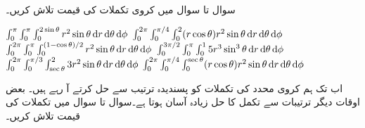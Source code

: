 \\
سوال  تا سوال  میں کروی تکملات کی قیمت تلاش کریں۔

$\int_{0}^{\pi}\int_{0}^{\pi}\int_{0}^{2\sin\theta} r^2\sin\theta \dif r\dif\theta\dif\phi$
$\int_{0}^{2\pi}\int_{0}^{\pi/4}\int_{0}^{2} (r\cos\theta) r^2\sin\theta\dif r\dif\theta\dif\phi$
$\int_{0}^{2\pi}\int_{0}^{\pi}\int_{0}^{(1-\cos\theta)/2} r^2\sin\theta\dif r\dif\theta\dif\phi$
$\int_{0}^{3\pi/2}\int_{0}^{\pi}\int_{0}^{1} 5 r^3\sin^3\theta\dif r\dif\theta\dif\phi$
$\int_{0}^{2\pi}\int_{0}^{\pi/3}\int_{\sec\theta}^{2} 3 r^2\sin\theta\dif r\dif\theta\dif\phi$
\wf{\unexpanded{
\(5\pi \)
}}
$\int_{0}^{2\pi}\int_{0}^{\pi/4}\int_{0}^{\sec\theta} (r\cos\theta) r^2\sin\theta\dif r\dif\theta\dif\phi$

اب تک ہم   کروی  محدد کی تکملات  کو پسندیدہ  ترتیب   سے حل کرتے آ رہے ہیں۔ بعض اوقات دیگر ترتیبات سے تکمل کا حل زیادہ آسان ہوتا ہے۔سوال  تا سوال  میں تکملات کی قیمت تلاش کریں۔

